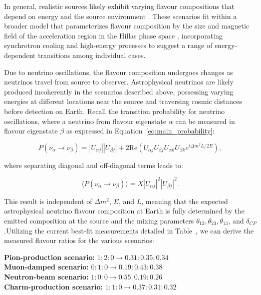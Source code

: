 In general, realistic sources likely exhibit varying flavour compositions that depend on energy and the source environment . These scenarios fit within a broader model that parameterizes flavour composition by the size and magnetic field of the acceleration region in the Hillas phase space , incorporating synchrotron cooling and high-energy processes to suggest a range of energy-dependent transitions among individual cases.

Due to neutrino oscillations, the flavour composition undergoes changes as neutrinos travel from source to observer. Astrophysical neutrinos are likely produced incoherently in the scenarios described above, possessing varying energies at different locations near the source and traversing cosmic distances before detection on Earth. Recall the transition probability for neutrino oscillations, where a neutrino from flavour eigenstate $\alpha$ can be measured in flavour eigenstate $\beta$ as expressed in Equation~\ref{eq:main_probability}:

\[
P(\nu_\alpha \to \nu_\beta) = |U_{\alpha j}| |U_{\beta j}| + 2 \text{Re}(U_{\alpha j} U_{\beta j} U_{\alpha k} U_{\beta k} e^{i \Delta m^2 L / 2E}),
\]

where separating diagonal and off-diagonal terms leads to:

\[
\langle P(\nu_\alpha \to \nu_\beta) \rangle = X |U_{\alpha j}|^2 |U_{\beta j}|^2.
\]

This result is independent of $\Delta m^2$, $E$, and $L$, meaning that the expected astrophysical neutrino flavour composition at Earth is fully determined by the emitted composition at the source and the mixing parameters $\theta_{12}, \theta_{23}, \theta_{13}$, and $\delta_{CP}$.Utilizing the current best-fit measurements detailed in Table~, we can derive the measured flavour ratios for the various scenarios:

\begin{kaobox}
\centering
\textbf{Pion-production scenario:} $1 : 2 : 0 \rightarrow 0.31 : 0.35 : 0.34$\\ 
\textbf{Muon-damped scenario:} $0 : 1 : 0 \rightarrow 0.19 : 0.43 : 0.38$\\ 
\textbf{Neutron-beam scenario:} $1 : 0 : 0 \rightarrow 0.55 : 0.19 : 0.26 $\\
\textbf{Charm-production scenario:} $1 : 1 : 0 \rightarrow 0.37 : 0.31 : 0.32$\\
\end{kaobox}


